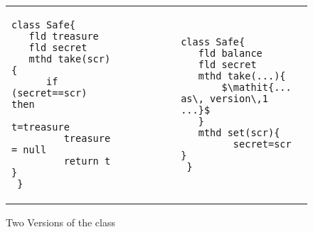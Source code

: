  \begin{figure}[htb]
 \begin{tabular}{lll} %
\begin{minipage}{0.45\textwidth}
\begin{lstlisting}
class Safe{
   fld treasure 
   fld secret 
   mthd take(scr){
      if (secret==scr) then 
         t=treasure
         treasure = null
         return t   }
 }
\end{lstlisting}
\end{minipage}
  &\ \ \  \ \ \ \ \  &
\begin{minipage}{0.45\textwidth}
\begin{lstlisting}
class Safe{
   fld balance  
   fld secret  
   mthd take(...){
       $\mathit{... as\, version\,1 ...}$ 
   }
   mthd set(scr){
         secret=scr }
 }
\end{lstlisting}
\end{minipage} 
 \end{tabular}
  \vspace*{-0.95cm}
  \caption{Two Versions of the class }
 \label{fig:ExampleSafe}
 \vspace*{-0.65cm}
 \end{figure}
 

